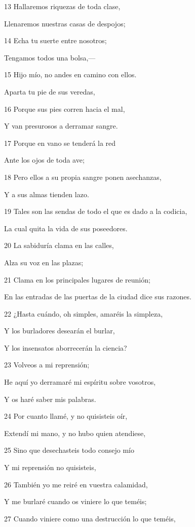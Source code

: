 \par 13 Hallaremos riquezas de toda clase,
\par Llenaremos nuestras casas de despojos;
\par 14 Echa tu suerte entre nosotros;
\par Tengamos todos una bolsa,—
\par 15 Hijo mío, no andes en camino con ellos.
\par Aparta tu pie de sus veredas,
\par 16 Porque sus pies corren hacia el mal,
\par Y van presurosos a derramar sangre.
\par 17 Porque en vano se tenderá la red
\par Ante los ojos de toda ave; 
\par 18 Pero ellos a su propia sangre ponen asechanzas,
\par Y a sus almas tienden lazo.
\par 19 Tales son las sendas de todo el que es dado a la codicia,
\par La cual quita la vida de sus poseedores.
\par 20 La sabiduría clama en las calles,
\par Alza su voz en las plazas;
\par 21 Clama en los principales lugares de reunión;
\par En las entradas de las puertas de la ciudad dice sus razones. 
\par 22 ¿Hasta cuándo, oh simples, amaréis la simpleza,
\par Y los burladores desearán el burlar,
\par Y los insensatos aborrecerán la ciencia?
\par 23 Volveos a mi reprensión;
\par He aquí yo derramaré mi espíritu sobre vosotros,
\par Y os haré saber mis palabras.
\par 24 Por cuanto llamé, y no quisisteis oír,
\par Extendí mi mano, y no hubo quien atendiese,
\par 25 Sino que desechasteis todo consejo mío
\par Y mi reprensión no quisisteis,
\par 26 También yo me reiré en vuestra calamidad,
\par Y me burlaré cuando os viniere lo que teméis;
\par 27 Cuando viniere como una destrucción lo que teméis,
